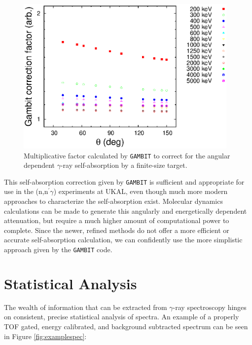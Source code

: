 \begin{figure}[ht]
\begin{center}
\includegraphics[width=0.97\textwidth]{gambit.eps}
\caption{Multiplicative factor calculated by {\tt GAMBIT} to correct for the angular dependent $\gamma$-ray self-absorption by a finite-size target. \label{fig:gambit}}
\end{center}
\end{figure}

This self-absorption correction given by {\tt GAMBIT} is sufficient and appropriate for use in the (n,n$^\prime\gamma$) experiments at UKAL, even though much more modern approaches to characterize the self-absorption exist. Molecular dynamics calculations can be made to generate this angularly and energetically dependent attenuation, but require a much higher amount of computational power to complete. Since the newer, refined methods do not offer a more efficient or accurate self-absorption calculation, we can confidently use the more simplistic approach given by the {\tt GAMBIT} code.

\section{Statistical Analysis}
The wealth of information that can be extracted from $\gamma$-ray spectroscopy hinges on consistent, precise statistical analysis of spectra. An example of a properly TOF gated, energy calibrated, and background subtracted spectrum can be seen in Figure \ref{fig:examplespec}:

